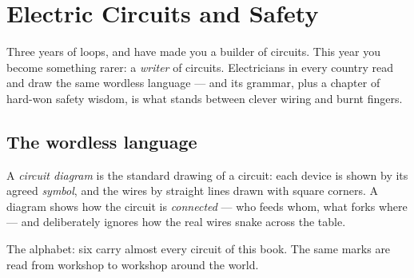 \chapter{Electric Circuits and Safety}\label{ch:g6:circuits-and-safety}

Three years of loops,  and  have made you a builder of
circuits. This year you become something rarer: a \emph{writer} of
circuits. Electricians in every country read and draw the same
wordless language --- and its grammar, plus a chapter of hard-won
safety wisdom, is what stands between clever wiring and burnt
fingers.

\section{The wordless language}

\begin{definition}\label{def:g6:circuits-and-safety:diagram}
A \emph{circuit diagram} is the standard
drawing of a circuit: each device is shown by its agreed
\emph{symbol}, and the wires by straight lines drawn
with square corners. A diagram shows how the circuit is
\emph{connected} --- who feeds whom, what forks where --- and
deliberately ignores how the real wires snake across the table.
\end{definition}

\begin{omfigure}

{\small The alphabet: six  carry almost every circuit of
this book. The same marks are read from workshop to workshop
around the world.}
\end{omfigure}


